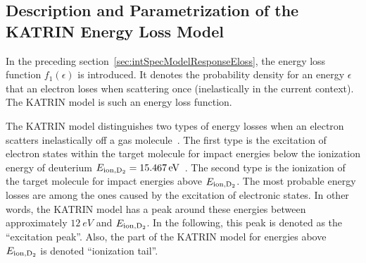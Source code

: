 \subsection{Description and Parametrization of the KATRIN Energy Loss Model}
\label{sec:katrinElossModelMainParametrization}
In the preceding section~\ref{sec:intSpecModelResponseEloss}, the energy loss function $f_1(\epsilon)$ is introduced. It denotes the probability density for an energy $\epsilon$ that an electron loses when scattering once (inelastically in the current context). The KATRIN model is such an energy loss function.

The KATRIN model distinguishes two types of energy losses when an electron scatters inelastically off a gas molecule~\cite{Hannen2019_2}. The first type is the excitation of electron states within the target molecule for impact energies below the ionization energy of deuterium $E_\mathrm{ion,D_2}=\SI{15.467}{eV}$~\cite{Shiner1993}. The second type is the ionization of the target molecule for impact energies above $E_\mathrm{ion,D_2}$. The most probable energy losses are among the ones caused by the excitation of electronic states. In other words, the KATRIN model has a peak around these energies between approximately $\SI{12}{eV}$ and $E_\mathrm{ion,D_2}$. In the following, this peak is denoted as the ``excitation peak''. Also, the part of the KATRIN model for energies above $E_\mathrm{ion,D_2}$ is denoted ``ionization tail''.

